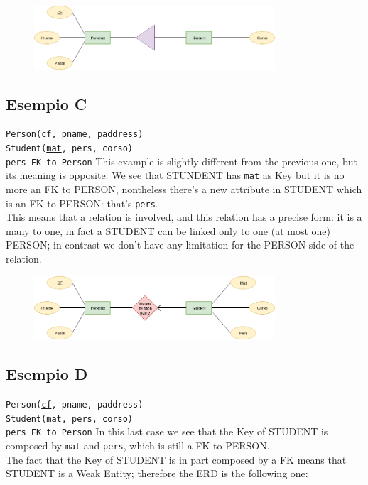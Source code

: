 \documentclass[class=book, crop=false, oneside]{standalone}
\newcommand\tab[1][1cm]{\hspace*{#1}}
\begin{document}
\begin{figure}[H]
	\includegraphics[width=0.8\textwidth,keepaspectratio]{diagram6_01.png}
	\label{diagram6_01}
\end{figure}

\subsection*{Esempio C}
\texttt{Person(\underline{cf}, pname, paddress)}\\
\texttt{Student(\underline{mat}, pers, corso)}\\
\tab[.4cm] \texttt{pers FK to Person}
\vskip 8pt
This example is slightly different from the previous one, but its meaning is opposite. We see that STUNDENT has \texttt{mat} as Key but it is no more an FK to PERSON, nontheless there's a new attribute in STUDENT which is an FK to PERSON: that's \texttt{pers}.\\
This means that a relation is involved, and this relation has a precise form: it is a many to one, in fact a STUDENT can be linked only to one (at most one) PERSON; in contrast we don't have any limitation for the PERSON side of the relation.

\begin{figure}[H]
	\includegraphics[width=0.8\textwidth,keepaspectratio]{diagram6_02.png}
	\label{diagram6_02}
\end{figure}

\subsection*{Esempio D}
\texttt{Person(\underline{cf}, pname, paddress)}\\
\texttt{Student(\underline{mat, pers}, corso)}\\
\tab[.4cm] \texttt{pers FK to Person}
\vskip 8pt
In this last case we see that the Key of STUDENT is composed by \texttt{mat} and \texttt{pers}, which is still a FK to PERSON.\\
The fact that the Key of STUDENT is in part composed by a FK means that STUDENT is a Weak Entity; therefore the ERD is the following one:
\end{document}
